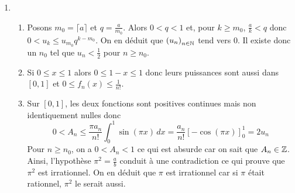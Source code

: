 \begin{enumerate}
 \item
\begin{enumerate}
 \item Posons $m_0=\lceil a\rceil$ et $q=\frac{a}{m_0}$. Alors $0<q<1$ et, pour $k\geq m_0$, $\frac{a}{k}<q$ donc $0<u_k\leq u_{m_0}q^{k-m_0}$. On en déduit que $\left( u_n\right) _{n\in \mathbb{N}}$ tend vers $0$. Il existe donc un $n_0$ tel que $u_n< \frac{1}{2}$ pour $n\geq n_0$.
 \item Si $0\leq x \leq 1$ alors $0\leq 1-x \leq 1$ donc leurs puissances sont aussi dans $[0,1]$ et $0\leq f_n(x)\leq \frac{1}{n!}$.
 \item Sur $[0,1]$, les deux fonctions sont positives continues mais non identiquement nulles donc
\begin{displaymath}
 0 < A_n \leq \frac{\pi a_n}{n!}\int_0^1\sin(\pi x)\,dx= \frac{a_n}{n!}\left[-\cos(\pi x) \right]_0^1=2u_n 
\end{displaymath}
Pour $n\geq n_0$, on a $0<A_n<1$ ce qui est absurde car on sait que $A_n\in \mathbb{Z}$. Ainsi, l'hypothèse $\pi^2=\frac{a}{b}$ conduit à une contradiction ce qui prouve que $\pi^2$ est irrationnel. On en déduit que $\pi$ est irrationnel car si $\pi$ était rationnel, $\pi^2$ le serait aussi.
\end{enumerate}

\end{enumerate}
